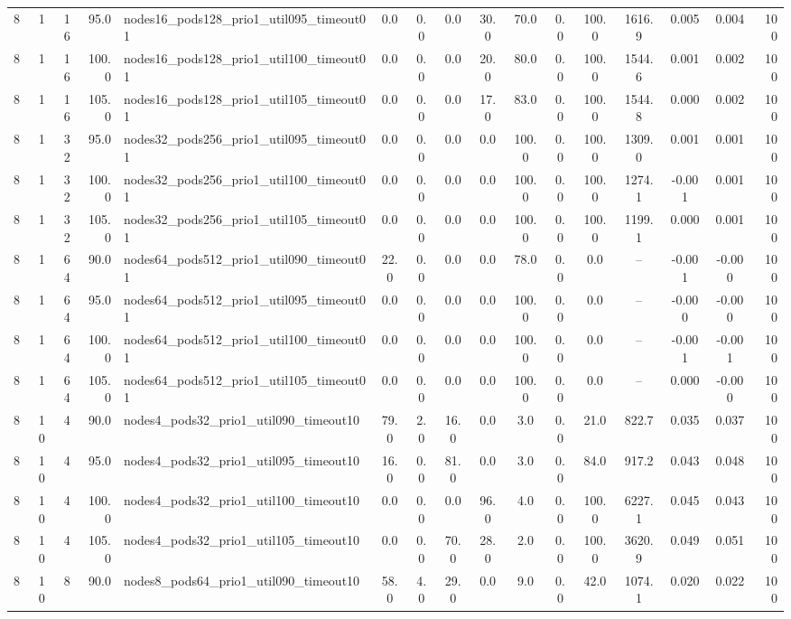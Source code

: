 \begin{tabular}{r r r r l c c c c c c c c c c r}
8 & 1 & 16 & 95.0 & nodes16\_pods128\_prio1\_util095\_timeout01 & 0.0 & 0.0 & 0.0 & 30.0 & 70.0 & 0.0 & 100.0 & 1616.9 & 0.005 & 0.004 & 100 \\
8 & 1 & 16 & 100.0 & nodes16\_pods128\_prio1\_util100\_timeout01 & 0.0 & 0.0 & 0.0 & 20.0 & 80.0 & 0.0 & 100.0 & 1544.6 & 0.001 & 0.002 & 100 \\
8 & 1 & 16 & 105.0 & nodes16\_pods128\_prio1\_util105\_timeout01 & 0.0 & 0.0 & 0.0 & 17.0 & 83.0 & 0.0 & 100.0 & 1544.8 & 0.000 & 0.002 & 100 \\
8 & 1 & 32 & 95.0 & nodes32\_pods256\_prio1\_util095\_timeout01 & 0.0 & 0.0 & 0.0 & 0.0 & 100.0 & 0.0 & 100.0 & 1309.0 & 0.001 & 0.001 & 100 \\
8 & 1 & 32 & 100.0 & nodes32\_pods256\_prio1\_util100\_timeout01 & 0.0 & 0.0 & 0.0 & 0.0 & 100.0 & 0.0 & 100.0 & 1274.1 & -0.001 & 0.001 & 100 \\
8 & 1 & 32 & 105.0 & nodes32\_pods256\_prio1\_util105\_timeout01 & 0.0 & 0.0 & 0.0 & 0.0 & 100.0 & 0.0 & 100.0 & 1199.1 & 0.000 & 0.001 & 100 \\
8 & 1 & 64 & 90.0 & nodes64\_pods512\_prio1\_util090\_timeout01 & 22.0 & 0.0 & 0.0 & 0.0 & 78.0 & 0.0 & 0.0 & -- & -0.001 & -0.000 & 100 \\
8 & 1 & 64 & 95.0 & nodes64\_pods512\_prio1\_util095\_timeout01 & 0.0 & 0.0 & 0.0 & 0.0 & 100.0 & 0.0 & 0.0 & -- & -0.000 & -0.000 & 100 \\
8 & 1 & 64 & 100.0 & nodes64\_pods512\_prio1\_util100\_timeout01 & 0.0 & 0.0 & 0.0 & 0.0 & 100.0 & 0.0 & 0.0 & -- & -0.001 & -0.001 & 100 \\
8 & 1 & 64 & 105.0 & nodes64\_pods512\_prio1\_util105\_timeout01 & 0.0 & 0.0 & 0.0 & 0.0 & 100.0 & 0.0 & 0.0 & -- & 0.000 & -0.000 & 100 \\
8 & 10 & 4 & 90.0 & nodes4\_pods32\_prio1\_util090\_timeout10 & 79.0 & 2.0 & 16.0 & 0.0 & 3.0 & 0.0 & 21.0 & 822.7 & 0.035 & 0.037 & 100 \\
8 & 10 & 4 & 95.0 & nodes4\_pods32\_prio1\_util095\_timeout10 & 16.0 & 0.0 & 81.0 & 0.0 & 3.0 & 0.0 & 84.0 & 917.2 & 0.043 & 0.048 & 100 \\
8 & 10 & 4 & 100.0 & nodes4\_pods32\_prio1\_util100\_timeout10 & 0.0 & 0.0 & 0.0 & 96.0 & 4.0 & 0.0 & 100.0 & 6227.1 & 0.045 & 0.043 & 100 \\
8 & 10 & 4 & 105.0 & nodes4\_pods32\_prio1\_util105\_timeout10 & 0.0 & 0.0 & 70.0 & 28.0 & 2.0 & 0.0 & 100.0 & 3620.9 & 0.049 & 0.051 & 100 \\
8 & 10 & 8 & 90.0 & nodes8\_pods64\_prio1\_util090\_timeout10 & 58.0 & 4.0 & 29.0 & 0.0 & 9.0 & 0.0 & 42.0 & 1074.1 & 0.020 & 0.022 & 100 \\

\end{tabular}
